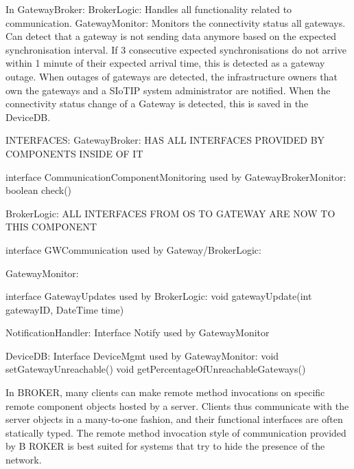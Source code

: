         In GatewayBroker:
            BrokerLogic: Handles all functionality related to communication.
            GatewayMonitor: Monitors the connectivity status all gateways. Can detect that a gateway is not sending data anymore based on the expected synchronisation interval. If 3 consecutive expected synchronisations do not arrive within 1 minute of their expected arrival time,
                            this is detected as a gateway outage. When outages of gateways are detected, the infrastructure owners that own the gateways and a SIoTIP system administrator are notified.
                            When the connectivity status change of a Gateway is detected, this is saved in the DeviceDB.

        INTERFACES:
            GatewayBroker:
                HAS ALL INTERFACES PROVIDED BY COMPONENTS INSIDE OF IT

                interface CommunicationComponentMonitoring used by GatewayBrokerMonitor:
                    boolean check()

            BrokerLogic:
                ALL INTERFACES FROM OS TO GATEWAY ARE NOW TO THIS COMPONENT

                interface GWCommunication used by Gateway/BrokerLogic:

            GatewayMonitor:

                interface GatewayUpdates used by BrokerLogic:
                    void gatewayUpdate(int gatewayID, DateTime time)

            NotificationHandler:
                Interface Notify used by GatewayMonitor

            DeviceDB:
                Interface DeviceMgmt used by GatewayMonitor:
                    void setGatewayUnreachable()
                    void getPercentageOfUnreachableGateways()


    In BROKER, many clients can make remote method invocations on
    specific remote component objects hosted by a server. Clients thus
    communicate with the server objects in a many-to-one fashion, and
    their functional interfaces are often statically typed. The remote
    method invocation style of communication provided by B ROKER is
    best suited for systems that try to hide the presence of the network.

